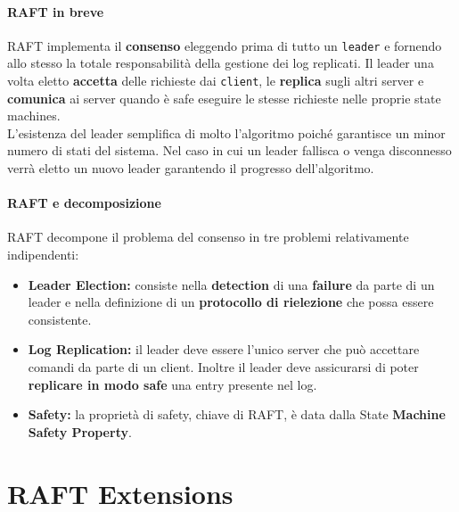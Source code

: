       \paragraph{RAFT in breve}
      RAFT implementa il \textbf{consenso} eleggendo prima di tutto un \texttt{leader} e fornendo allo stesso la totale responsabilità della gestione dei log replicati. Il leader una volta eletto \textbf{accetta} delle richieste dai \texttt{client}, le \textbf{replica} sugli altri server e \textbf{comunica} ai server quando è safe eseguire le stesse richieste nelle proprie state machines.\\
      L'esistenza del leader semplifica di molto l'algoritmo poiché garantisce un minor numero di stati del sistema. Nel caso in cui un leader fallisca o venga disconnesso verrà eletto un nuovo leader garantendo il progresso dell'algoritmo.

      \paragraph{RAFT e decomposizione}
      RAFT decompone il problema del consenso in tre problemi relativamente indipendenti:
      \begin{itemize}
        \item{\textbf{Leader Election:}}
         consiste nella \textbf{detection} di una \textbf{failure} da parte di un leader e nella definizione di un \textbf{protocollo di rielezione} che possa essere consistente.
        \item{\textbf{Log Replication:}}
        il leader deve essere l'unico server che può accettare comandi da parte di un client. Inoltre il leader deve assicurarsi di poter \textbf{replicare in modo safe} una entry presente nel log. 
        \item{\textbf{Safety:}}
        la proprietà di safety, chiave di RAFT, è data dalla State \textbf{Machine Safety Property}.
      \end{itemize}

		
		
		
		
	\section{RAFT Extensions}
		
		
		